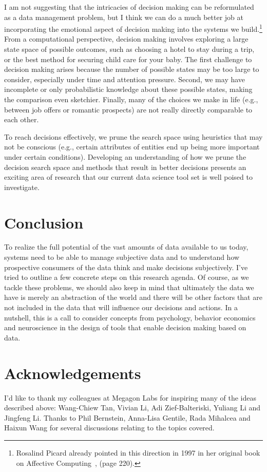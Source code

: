 \documentclass[11pt]{article}
\begin{document}
I am not suggesting that the intricacies of decision making can be reformulated as a data management problem, but I think we can do a much better job at incorporating the emotional aspect of decision making into the systems we build.\footnote{Rosalind Picard already pointed in this direction in 1997 in her original book on Affective Computing~\cite{picard-book}, (page 220).} 
From a computational perspective, decision making involves exploring a large state space of possible outcomes, such as choosing a hotel to stay during a trip, or the best method for securing child care for your baby. The first challenge to decision making arises because the number of possible states may be too large to consider,  especially under time and attention pressure. Second, we may have incomplete or only probabilistic knowledge about these possible states, making the comparison even sketchier. Finally, many of the choices we make in life (e.g., between job offers or romantic prospects) are not really directly comparable  to each other.

To reach decisions effectively, we prune the search space using heuristics that may not be conscious (e.g., certain attributes of entities end up being more important under certain conditions). Developing an understanding of how we prune the decision search space and methods that result in better decisions presents an exciting area of research that our current data science tool set is well poised to investigate.

\section{Conclusion}
To  realize the full potential of the vast amounts of data available to us today, systems need to be able to manage subjective data and to understand how prospective consumers of the data think and make decisions subjectively. I've tried to outline a few concrete steps on this research agenda. Of course, as we tackle these problems, we should also keep in mind that ultimately the data we have is merely an abstraction of the world and there will be other factors that are not included in the data that will influence our decisions and actions. In a nutshell, this is a call to consider concepts from psychology, behavior economics and neuroscience in the design of tools that enable decision making based on data. 

\section{Acknowledgements}
I'd like to thank my colleagues at Megagon Labs for inspiring many of the ideas described above: Wang-Chiew Tan, Vivian Li, Adi Zief-Balteriski, Yuliang Li and Jingfeng Li. Thanks to Phil Bernstein,  Anna-Lisa Gentile, Rada Mihalcea and Haixun Wang for several discussions relating to the topics covered.
\end{document}

